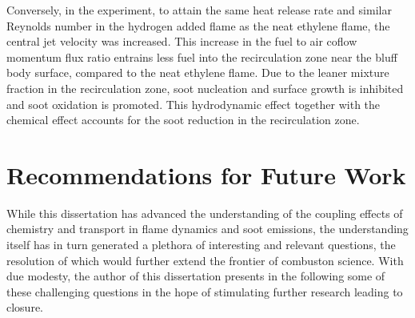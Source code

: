 Conversely, in the experiment, to attain the same heat release rate and similar Reynolds number in the hydrogen added flame as the neat ethylene flame, the central jet velocity was increased.  This increase in the fuel to air coflow momentum flux ratio entrains less fuel into the recirculation zone near the bluff body surface, compared to the neat ethylene flame.  Due to the leaner mixture fraction in the recirculation zone, soot nucleation and surface growth is inhibited and soot oxidation is promoted.  This hydrodynamic effect together with the chemical effect accounts for the soot reduction in the recirculation zone.    
 
\section{Recommendations for Future Work}

While this dissertation has advanced the understanding of the coupling effects of chemistry and transport in flame dynamics and soot emissions, the understanding itself has in turn generated a plethora of interesting and relevant questions, the resolution of which would further extend the frontier of combuston science.  With due modesty, the author of this dissertation presents in the following some of these challenging questions in the hope of stimulating further research leading to closure.

